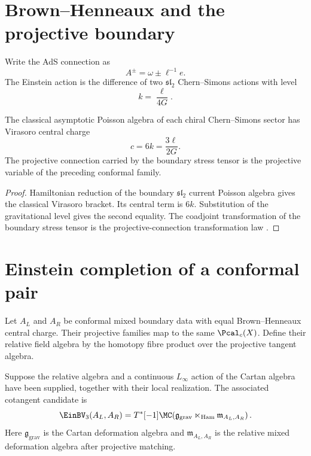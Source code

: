 \chapter{Brown--Henneaux and the projective boundary}
Write the AdS connection as
\[
 A^\pm=\omega\pm\ell^{-1}e.
\]
The Einstein action is the difference of two $\mathfrak{sl}_2$ Chern--Simons actions with level
\[
 k=\frac{\ell}{4G}.
\]

\begin{theorem}
The classical asymptotic Poisson algebra of each chiral Chern--Simons sector has Virasoro central charge
\[
 c=6k=\frac{3\ell}{2G}.
\]
The projective connection carried by the boundary stress tensor is the projective variable of the preceding conformal family.
\end{theorem}
\begin{proof}
Hamiltonian reduction of the boundary $\mathfrak{sl}_2$ current Poisson algebra gives the classical Virasoro bracket.  Its central term is $6k$.  Substitution of the gravitational level gives the second equality.  The coadjoint transformation of the boundary stress tensor is the projective-connection transformation law 
\cite{BrownHenneaux}.
\end{proof}

\chapter{Einstein completion of a conformal pair}
Let $A_L$ and $A_R$ be conformal mixed boundary data with equal Brown--Henneaux central charge.  Their projective families map to the same $\Pcal_c(X)$.  Define their relative field algebra by the homotopy fibre product over the projective tangent algebra.

\begin{definition}
Suppose the relative algebra and a continuous $L_\infty$ action of the Cartan algebra have been supplied, together with their local realization. The associated cotangent candidate is
\[
 \EinBV_3(A_L,A_R)
 =T^*[-1]\MC\!\left(
   \mathfrak g_{\mathrm{grav}}
   \ltimes_{\mathrm{Ham}}
   \mathfrak m_{A_L,A_R}
  \right).
\]
Here $\mathfrak g_{\mathrm{grav}}$ is the Cartan deformation algebra and $\mathfrak m_{A_L,A_R}$ is the relative mixed deformation algebra after projective matching.
\end{definition}

